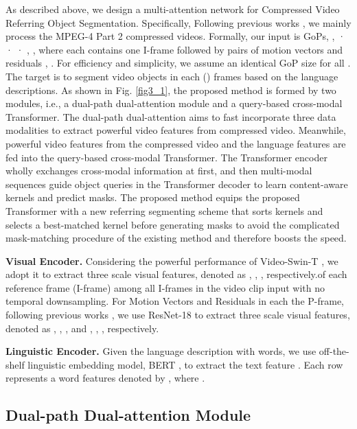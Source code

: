 \documentclass[sigconf]{acmart}
\begin{document}
As described above, we design a multi-attention network for Compressed Video Referring Object
Segmentation. Specifically, Following previous works \cite{shou2019dmc, wu2018compressed, li2020slow, hu2020mv2flow, yu2020self}, we mainly process the MPEG-4 Part 2 compressed videos. Formally, our input is  GoPs, , · · · , , where each  contains one I-frame  followed by  pairs of motion vectors  and residuals , . For efficiency and simplicity, we assume an identical GoP size  for all . The target is to segment video objects in each () frames based on the language descriptions.
As shown in Fig. \ref{fig3_1}, the proposed method is formed by two modules, i.e., a dual-path dual-attention module and a query-based cross-modal Transformer. The dual-path dual-attention aims to fast incorporate three data modalities to extract powerful video features from compressed video. Meanwhile, powerful video features from the compressed video and the language features are fed into the query-based cross-modal Transformer. The Transformer encoder wholly exchanges cross-modal information at first, and then multi-modal sequences guide object queries in the Transformer decoder to learn content-aware kernels and predict masks. The proposed method equips the proposed Transformer with a new referring segmenting scheme that sorts kernels and selects a best-matched kernel before generating masks to avoid the complicated mask-matching procedure of the existing method and therefore boosts the speed.


\textbf{Visual Encoder.} Considering the powerful performance of Video-Swin-T \cite{liu2021swin, liu2021video}, we adopt it to extract three scale visual features, denoted as , , , respectively.of each reference frame (I-frame) among all I-frames in the video clip input with no temporal downsampling. For Motion Vectors and Residuals in each the P-frame, following previous works \cite{shou2019dmc, wu2018compressed}, we use ResNet-18 \cite{he2016deep} to extract three scale visual features, denoted as , , , and , , , respectively. 


\textbf{Linguistic Encoder.} Given the language description with  words, we use off-the-shelf linguistic embedding model, BERT \cite{devlin2018bert}, to extract the text feature . Each row represents a word features denoted by , where .


\subsection{Dual-path Dual-attention Module}
\end{document}
